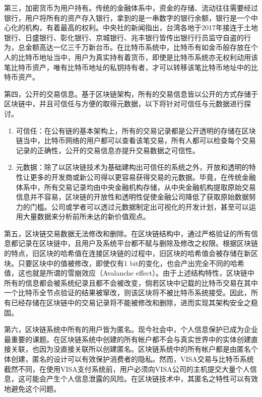 				第三，加密货币为用户持有。传统的金融体系中，资金的存储、流动往往需要经过银行，用户将所有的资产存入银行，拿到的是一串数字的银行余额，银行是一个中心化的机构，有着最高的权利。中央社的新闻\supercite{Bankguardsstolen}指出，台湾各地于2017年接连于土地银行、日盛银行、彰化银行、京城银行、兆丰银行皆传出银行行员监守自盗的行为，总金额高达一亿三千万新台币。在比特币系统中，比特币有如金币般存放在个人的比特币地址当中，用户为真实持有着货币，即使是比特币系统亦无权利动用该笔比特币资产，唯有比特币地址的私钥持有者，才可以转移该笔比特币地址中的比特币资产。

				第四，公开的交易信息。基于区块链架构，所有的交易信息皆以公开的方式存储于区块链中，并且可信任与方便的取得元数据，以下将针对可信任与元数据进行探讨。
				\begin{enumerate}
					\item 可信任：在公有链的基本架构上，所有的交易记录都是公开透明的存储在区块链当中，比特币网络的用户都可以查看该笔交易，所有人都可以检查每个交易记录的正确性，公开的交易信息亦提升交易数据之可信性。
					\item 元数据：除了以区块链技术为基础建构出可信任的系统之外，开放和透明的特性让更多的开发商或新公司得以更容易获得交易的元数据。毕竟，在传统金融体系中，所有交易记录均由中央金融机构存储，从中央金融机构提取原始交易信息并不容易，区块链的开放性和透明性促使金融公司降低了获取原始数据努力的门槛。公司或学者可以透过元数据制定出可视化的开发计划，甚至可以运用大量数据来分析前所未达的新价值观点。
				\end{enumerate}

				第五，区块链交易数据无法修改和删除。在区块链结构中，通过严格验证的所有信息都记录在区块链中，且用户及系统平台都不赋与删除及修改之权限。根据区块链的特点，旧区块的哈希值在连接区块链的过程中，旧区块的哈希值会被存储在新区块。只要区块中的值被修改，即使仅有1 bit的变化，也会产出完全不同的哈希值，这也就是所谓的雪崩效应（Avalanche effect）\supercite{Theuseofbentsequencestoachievehigher-orderstrictavalanchecriterioninS-boxdesign}。由于上述结构特性，区块链中所有的信息都会被系统纪录且都不会被改变，倘若区块中记载的比特币交易在其中一个比特币全节点验证的结果被窜改，则该区块将不被比特币系统接受。因此，所有已经存储在区块链中的交易记录将不能被修改和删除，进而实现其架构安全之稳固。

				第六，区块链系统中所有的用户皆为匿名。现今社会中，个人信息保护已成为企业最重要的课题。在区块链系统中创建的所有帐户都不会与真实世界中的实体创建直接关联，也因为没直接关联所以创建匿名。区块链系统中的所有帐户都是由匿名个体创建，匿名的设计可以有效保护消费者的隐私。然而，VISA交易与比特币系统截然不同，在使用VISA支付系统前，用户必须向VISA公司的主机提交大量个人信息，这可能会产生个人信息泄露的风险。在区块链技术中，其匿名之特性可以有效地避免这个问题。

